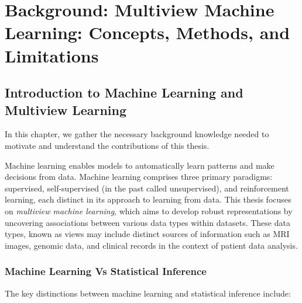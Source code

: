 \graphicspath{{chapters/background/}}
\chapter{Background: Multiview Machine Learning: Concepts, Methods, and Limitations}\label{chap:background}
\minitoc
\section{Introduction to Machine Learning and Multiview Learning}

In this chapter, we gather the necessary background knowledge needed to motivate and understand the contributions of this thesis.

Machine learning enables models to automatically learn patterns and make decisions from data.
Machine learning comprises three primary paradigms: supervised, self-supervised (in the past called unsupervised), and reinforcement learning, each distinct in its approach to learning from data.
This thesis focuses on \textit{multiview machine learning}, which aims to develop robust representations by uncovering associations between various data types within datasets.
These data types, known as \gls{views} may include distinct sources of information such as MRI images, genomic data, and clinical records in the context of patient data analysis.

\subsection{Machine Learning Vs Statistical Inference}
The key distinctions between machine learning and statistical inference include:

